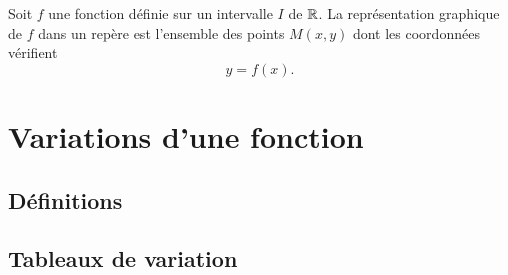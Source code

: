 \documentclass[a4paper,11pt,DIV18,BCOR0mm]{scrartcl}
\begin{document}
\begin{definition}
 Soit $f$ une fonction définie sur un intervalle $I$ de $\mathbb{R}$. La représentation graphique
de $f$ dans un repère est l'ensemble des points $M(x,y)$ dont les coordonnées vérifient
\[
 y=f(x).
\]
\end{definition}

\section{Variations d'une fonction}
\subsection{Définitions}
\subsection{Tableaux de variation}
\end{document}

